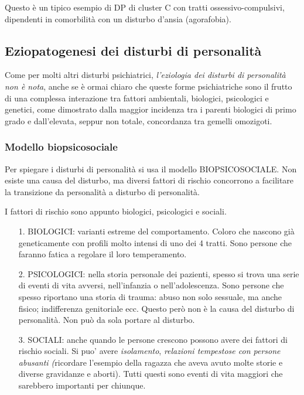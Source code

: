 Questo è un tipico esempio di DP di cluster C con tratti
ossessivo-compulsivi, dipendenti in comorbilità con un disturbo d'ansia
(agorafobia).

\subsection{Eziopatogenesi dei disturbi di personalità}

Come per molti altri disturbi psichiatrici, \emph{l'eziologia dei
disturbi di personalità non è nota}, anche se è ormai chiaro che queste
forme psichiatriche sono il frutto di una complessa interazione tra
fattori ambientali, biologici, psicologici e genetici, come dimostrato
dalla maggior incidenza tra i parenti biologici di primo grado e
dall'elevata, seppur non totale, concordanza tra gemelli omozigoti.

\subsubsection{Modello biopsicosociale}

Per spiegare i disturbi di personalità si usa il modello
BIOPSICOSOCIALE. Non esiste una causa del disturbo, ma diversi fattori
di rischio concorrono a facilitare la transizione da personalità a
disturbo di personalità.

I fattori di rischio sono appunto biologici, psicologici e sociali.

\begin{itemize}
\item[1.]
  BIOLOGICI: varianti estreme del comportamento. Coloro che nascono già
  geneticamente con profili molto intensi di uno dei 4 tratti. Sono
  persone che faranno fatica a regolare il loro temperamento.
\item[2.]
  PSICOLOGICI: nella storia personale dei pazienti, spesso si trova una
  serie di eventi di vita avversi, nell'infanzia o nell'adolescenza.
  Sono persone che spesso riportano una storia di trauma: abuso non solo
  sessuale, ma anche fisico; indifferenza genitoriale ecc. Questo però
  non è la causa del disturbo di personalità. Non può da sola portare al
  disturbo.
\item[3.]
  SOCIALI: anche quando le persone crescono possono avere dei fattori di
  rischio sociali. Si puo' avere \emph{isolamento}, \emph{relazioni
  tempestose con persone abusanti (}ricordare l'esempio della ragazza
  che aveva avuto molte storie e diverse gravidanze e aborti). Tutti
  questi sono eventi di vita maggiori che sarebbero importanti per
  chiunque.
\end{itemize}


